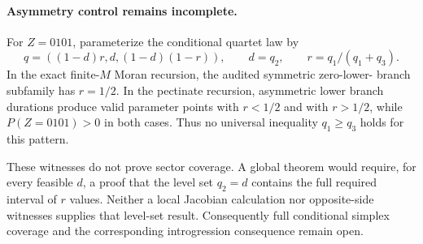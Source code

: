 \paragraph{Asymmetry control remains incomplete.}
For $Z=0101$, parameterize the conditional quartet law by
\[
q=((1-d)r,d,(1-d)(1-r)),
\qquad d=q_2,
\qquad r=q_1/(q_1+q_3).
\]
In the exact finite-$M$ Moran recursion, the audited symmetric zero-lower-
branch subfamily has $r=1/2$. In the pectinate recursion, asymmetric lower
branch durations produce valid parameter points with $r<1/2$ and with
$r>1/2$, while $P(Z=0101)>0$ in both cases. Thus no universal inequality
$q_1\ge q_3$ holds for this pattern.

These witnesses do not prove sector coverage. A global theorem would require,
for every feasible $d$, a proof that the level set $q_2=d$ contains the full
required interval of $r$ values. Neither a local Jacobian calculation nor
opposite-side witnesses supplies that level-set result. Consequently full
conditional simplex coverage and the corresponding introgression consequence
remain open.
